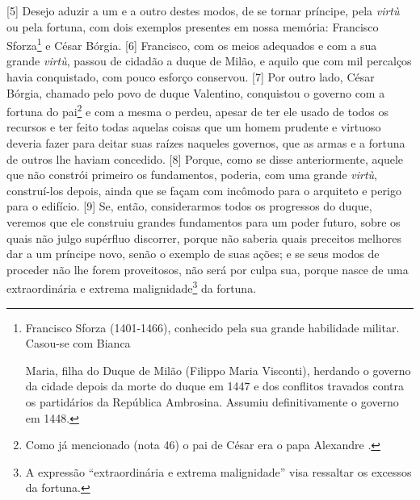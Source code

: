{[}5{]} Desejo aduzir a um e a outro destes modos, de se tornar
príncipe, pela \emph{virtù} ou pela fortuna, com dois exemplos presentes
em nossa memória: Francisco Sforza\footnote{Francisco Sforza
  (1401-1466), conhecido pela sua grande habilidade militar. Casou-se
  com Bianca

  Maria, filha do Duque de Milão (Filippo Maria Visconti), herdando o
  governo da cidade depois da morte do duque em 1447 e dos conflitos
  travados contra os partidários da República Ambrosina. Assumiu
  definitivamente o governo em 1448.} e César Bórgia. {[}6{]} Francisco,
com os meios adequados e com a sua grande \emph{virtù}, passou de
cidadão a duque de Milão, e aquilo que com mil percalços havia
conquistado, com pouco esforço conservou. {[}7{]} Por outro lado, César
Bórgia, chamado pelo povo de duque Valentino, conquistou o governo com a
fortuna do pai\footnote{Como já mencionado (nota 46) o pai de César era
  o papa Alexandre .} e com a mesma o perdeu, apesar de ter ele usado
de todos os recursos e ter feito todas aquelas coisas que um homem
prudente e virtuoso deveria fazer para deitar suas raízes naqueles
governos, que as armas e a fortuna de outros lhe haviam concedido.
{[}8{]} Porque, como se disse anteriormente, aquele que não constrói
primeiro os fundamentos, poderia, com uma grande \emph{virtù},
construí-los depois, ainda que se façam com incômodo para o arquiteto e
perigo para o edifício. {[}9{]} Se, então, considerarmos todos os
progressos do duque, veremos que ele construiu grandes fundamentos para
um poder futuro, sobre os quais não julgo supérfluo discorrer, porque
não saberia quais preceitos melhores dar a um príncipe novo, senão o
exemplo de suas ações; e se seus modos de proceder não lhe forem
proveitosos, não será por culpa sua, porque nasce de uma extraordinária
e extrema malignidade\footnote{A expressão ``extraordinária e extrema
  malignidade'' visa ressaltar os excessos da fortuna.} da fortuna.

